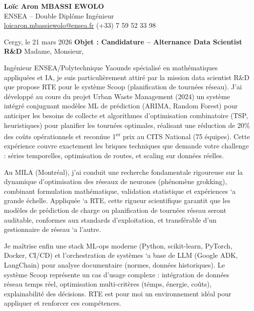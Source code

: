 \documentclass[a4paper,11pt]{article}
\begin{document}
\noindent \textbf{Lo\"ic Aron MBASSI EWOLO} \\
ENSEA -- Double Dipl\^ome Ing\'enieur \\
\href{mailto:loicaron.mbassiewolo@ensea.fr}{loicaron.mbassiewolo@ensea.fr} \quad (+33) 7 59 52 33 98

\vspace{1em}\noindent Cergy, le 21 mars 2026
\vspace{1em}\noindent \textbf{Objet : Candidature -- Alternance Data Scientist R\&D}
\vspace{1.5em}\noindent Madame, Monsieur,

\vspace{0.8em}\noindent Ing\'enieur ENSEA/Polytechnique Yaounde sp\'ecialis\'e en math\'ematiques appliqu\'ees et IA, je suis particuli\`erement attir\'e par la mission data scientist R\&D que propose RTE pour le syst\`eme Scoop (planification de tourn\'ees r\'eseau). J'ai d\'evelopp\'e au cours du projet Urban Waste Management (2024) un syst\`eme int\'egr\'e conjuguant mod\`eles ML de pr\'ediction (ARIMA, Random Forest) pour anticiper les besoins de collecte et algorithmes d'optimisation combinatoire (TSP, heuristiques) pour planifier les tournées optimales, r\'ealisant une r\'eduction de 20\% des co\^uts op\'erationnels et recon\'nue 1\textsuperscript{er} prix au CITS National (75 \'equipes). Cette exp\'erience couvre exactement les briques techniques que demande votre challenge : s\'eries temporelles, optimisation de routes, et scaling sur donn\'ees r\'eelles.

\vspace{0.8em}\noindent Au MILA (Montréal), j'ai conduit une recherche fondamentale rigoureuse sur la dynamique d'optimisation des r\'eseaux de neurones (phénomène grokking), combinant formulation math\'ematique, validation statistique et expériences `a grande \'echelle. Appliquée `a RTE, cette rigueur scientifique garantit que les mod\`eles de prédiction de charge ou planification de tournées r\'eseau seront auditable, conformes aux standards d'exploitation, et transférable d'un gestionnaire de r\'eseau `a l'autre.

\vspace{0.8em}\noindent Je maîtrise enfin une stack ML-ops moderne (Python, scikit-learn, PyTorch, Docker, CI/CD) et l'orchestration de syst\`emes `a base de LLM (Google ADK, LangChain) pour analyse documentaire (normes, donn\'ees historiques). Le syst\`eme Scoop repr\'esente un cas d'usage complexe : intégration de données r\'eseau temps r\'eel, optimisation multi-crit\`eres (t\'emps, \'energie, co\^uts), explainabilit\'e des décisions. RTE est pour moi un environnement id\'eal pour appliquer et renforcer ces comp\'etences.
\end{document}

